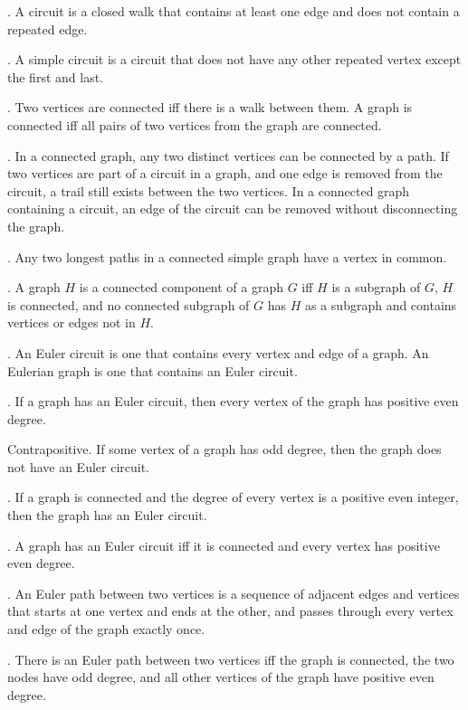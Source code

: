 \documentclass{slnotes}
\begin{document}
. A circuit is a closed walk that contains at least one edge and does not contain a repeated edge.

. A simple circuit is a circuit that does not have any other repeated vertex except the first and last.

. Two vertices are connected iff there is a walk between them. A graph is connected iff all pairs of two vertices from the graph are connected.

. In a connected graph, any two distinct vertices can be connected by a path. If two vertices are part of a circuit in a graph, and one edge is removed from the circuit, a trail still exists between the two vertices. In a connected graph containing a circuit, an edge of the circuit can be removed without disconnecting the graph.

. Any two longest paths in a connected simple graph have a vertex in common.

. A graph \(H\) is a connected component of a graph \(G\) iff \(H\) is a subgraph of \(G\), \(H\) is connected, and no connected subgraph of \(G\) has \(H\) as a subgraph and contains vertices or edges not in \(H\).

. An Euler circuit is one that contains every vertex and edge of a graph. An Eulerian graph is one that contains an Euler circuit.

. If a graph has an Euler circuit, then every vertex of the graph has positive even degree.

Contrapositive. If some vertex of a graph has odd degree, then the graph does not have an Euler circuit.

. If a graph is connected and the degree of every vertex is a positive even integer, then the graph has an Euler circuit.

. A graph has an Euler circuit iff it is connected and every vertex has positive even degree.

. An Euler path between two vertices is a sequence of adjacent edges and vertices that starts at one vertex and ends at the other, and passes through every vertex and edge of the graph exactly once.

. There is an Euler path between two vertices iff the graph is connected, the two nodes have odd degree, and all other vertices of the graph have positive even degree.
\end{document}
